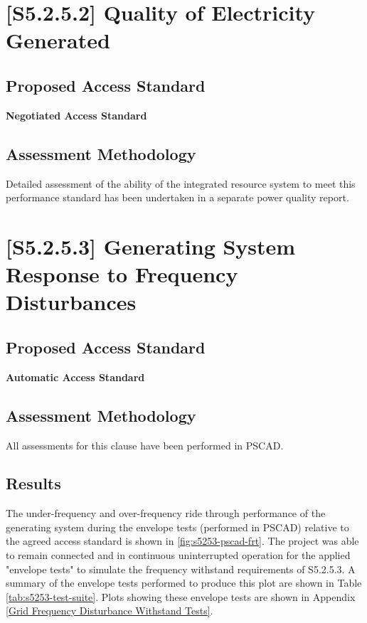 \documentclass{../grid-link-report}
\newcommand{\projectassetsdir}{../project-assets}
\begin{document}
	\section{[S5.2.5.2] Quality of Electricity Generated}
	\subsection{Proposed Access Standard}
	\textbf{Negotiated Access Standard}
		\begin{tcolorbox}[lightgreenbox]
			
		\end{tcolorbox}
	
	\subsection{Assessment Methodology}
		Detailed assessment of the ability of the integrated resource system to meet this performance standard has been undertaken in a separate power quality report. \cite{power-quality-report}

	\section{[S5.2.5.3] Generating System Response to Frequency Disturbances}
		\subsection{Proposed Access Standard}
		\textbf{Automatic Access Standard}
			\begin{tcolorbox}[lightgreenbox]
				
			\end{tcolorbox}
			
		\subsection{Assessment Methodology}
			
		
			All assessments for this clause have been performed in PSCAD.
			
		\subsection{Results}
			
			The under-frequency and over-frequency ride through performance of the generating system during the envelope tests (performed in PSCAD) relative to the agreed access standard is shown  in \ref{fig:s5253-pscad-frt}. The project was able to remain connected and in continuous uninterrupted operation for the applied "envelope tests" to simulate the frequency withstand requirements of S5.2.5.3.  A summary of the envelope tests performed to produce this plot are shown in Table \ref{tab:s5253-test-suite}. Plots showing these envelope tests are shown in Appendix \ref{Grid Frequency Disturbance Withstand Tests}.
			
\end{document}
